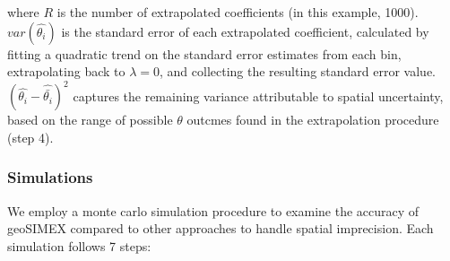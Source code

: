 \noindent where $R$ is the number of extrapolated coefficients (in this example, 1000). 
$var(\hat{\theta_i})$ is the standard error of each extrapolated coefficient, calculated by fitting a quadratic trend on the standard error estimates from each bin, extrapolating back to $\lambda=0$, and collecting the resulting standard error value. 
$(\hat{\theta_i}-\hat{\bar{\theta_i}})^2$ captures the remaining variance attributable to spatial uncertainty, based on the range of possible $\theta$ outcmes found in the extrapolation procedure (step 4).  

\subsubsection{Simulations}

We employ a monte carlo simulation procedure to examine the accuracy of geoSIMEX compared to other approaches to handle spatial imprecision. 
Each simulation follows 7 steps:

